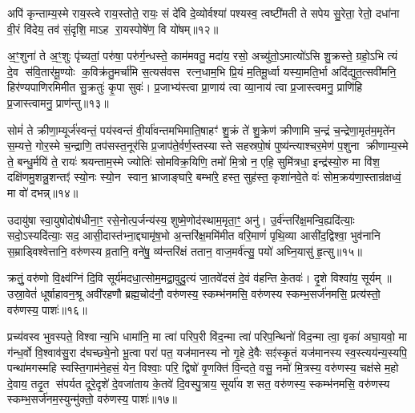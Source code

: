 अपि॑ कृन्ताम्य॒स्मे राय॒स्त्वे राय॒स्तोते॒ रायः॒ सं दे॑वि दे॒व्योर्वश्या॑ पश्यस्व॒ त्वष्टी॑मती ते सपेय सु॒रेता॒ रेतो॒ दधा॑ना वी॒रं वि॑देय॒ तव॑ सं॒दृशि॒ माऽह रा॒यस्पोषे॑ण॒ वि यो॑षम्॥१२॥

{\anuvakamend[{अ॒स्य॒ ग्री॒वा एका॒न्नत्रि॒ꣳ॒शच्च॑॥५॥}]}

अ॒ꣳ॒शुना॑ ते अ॒ꣳ॒शुः पृ॑च्यतां॒ परु॑षा॒ परु॑र्ग॒न्धस्ते॒ काम॑मवतु॒ मदा॑य॒ रसो॒ अच्यु॑तो॒ऽमात्यो॑ऽसि शु॒क्रस्ते॒ ग्रहो॒ऽभि त्यं दे॒व स॑वि॒तार॑मू॒ण्योः क॒विक्र॑तु॒मर्चा॑मि स॒त्यस॑वस रत्न॒धाम॒भि प्रि॒यं म॒तिमू॒र्ध्वा यस्या॒मति॒र्भा अदि॑द्युत॒त्सवी॑मनि॒ हिर॑ण्यपाणिरमिमीत सु॒क्रतुः॑ कृ॒पा सुवः॑। प्र॒जाभ्य॑स्त्वा प्रा॒णाय॑ त्वा व्या॒नाय॑ त्वा प्र॒जास्त्वमनु॒ प्राणि॑हि प्र॒जास्त्वामनु॒ प्राण॑न्तु॥१३॥

{\anuvakamend[{अनु॑ स॒प्त च॑॥६॥}]}

सोमं॑ ते क्रीणा॒म्यूर्ज॑स्वन्तं॒ पय॑स्वन्तं वी॒र्या॑वन्तमभिमाति॒षाहꣳ॑ शु॒क्रं ते॑ शु॒क्रेण॑ क्रीणामि च॒न्द्रं च॒न्द्रेणा॒मृत॑म॒मृते॑न स॒म्यत्ते॒ गोर॒स्मे च॒न्द्राणि॒ तप॑सस्त॒नूर॑सि प्र॒जाप॑ते॒र्वर्ण॒स्तस्यास्ते सहस्रपो॒षं पुष्य॑न्त्याश्चर॒मेण॑ प॒शुना क्रीणाम्य॒स्मे ते॒ बन्धु॒र्मयि॑ ते॒ रायः॑ श्रयन्ताम॒स्मे ज्योतिः॑ सोमविक्र॒यिणि॒ तमो॑ मि॒त्रो न॒ एहि॒ सुमि॑त्रधा॒ इन्द्र॑स्यो॒रु मा वि॑श॒ दक्षि॑णमु॒शन्नु॒शन्तꣵ॑ स्यो॒नः स्यो॒न स्वान॒ भ्राजाङ्घा॑रे॒ बम्भा॑रे॒ हस्त॒ सुह॑स्त॒ कृशा॑नवे॒ते वः॑ सोम॒क्रय॑णा॒स्तान्र॑क्षध्वं॒ मा वो॑ दभन्न्॥१४॥

{\anuvakamend[{ऊ॒रुं द्वाविꣳ॑शतिश्व॥७॥}]}

उदायु॑षा स्वा॒युषोदोष॑धीना॒ꣳ॒ रसे॒नोत्प॒र्जन्य॑स्य॒ शुष्मे॒णोद॑स्थाम॒मृता॒ꣳ॒ अनु॑। उ॒र्व॑न्तरि॑क्ष॒मन्वि॒ह्यदि॑त्याः॒ सदो॒ऽस्यदि॑त्याः॒ सद॒ आसी॒दास्त॑भ्ना॒द्द्यामृ॑ष॒भो अ॒न्तरि॑क्ष॒ममि॑मीत वरि॒माणं॑ पृथि॒व्या आसी॑द॒द्विश्वा॒ भुव॑नानि स॒म्राड्विश्वेत्तानि॒ वरु॑णस्य व्र॒तानि॒ वने॑षु॒ व्य॑न्तरि॑क्षं ततान॒ वाज॒मर्व॑त्सु॒ पयो॑ अघ्नि॒यासु॑ हृ॒त्सु॥१५॥

क्रतुं॒ वरु॑णो वि॒क्ष्व॑ग्निं दि॒वि सूर्य॑मदधा॒त्सोम॒मद्रा॒वुदु॒त्यं जा॒तवे॑दसं दे॒वं व॑हन्ति के॒तवः॑। दृ॒शे विश्वा॑य॒ सूर्यम्॥ उस्रा॒वेतं॑ धूर्\mbox{}षाहावन॒श्रू अवी॑रहणौ ब्रह्म॒चोद॑नौ॒ वरु॑णस्य॒ स्कम्भ॑नमसि॒ वरु॑णस्य स्कम्भ॒सर्ज॑नमसि॒ प्रत्य॑स्तो॒ वरु॑णस्य॒ पाशः॑॥१६॥

{\anuvakamend[{हृ॒त्सु पञ्च॑त्रिशच्च॥८॥}]}

प्रच्य॑वस्व भुवस्पते॒ विश्वान्य॒भि धामा॑नि॒ मा त्वा॑ परिप॒री वि॑द॒न्मा त्वा॑ परिप॒न्थिनो॑ विद॒न्मा त्वा॒ वृका॑ अघा॒यवो॒ मा ग॑न्ध॒र्वो वि॒श्वाव॑सु॒रा द॑घच्छ्ये॒नो भू॒त्वा परा॑ पत॒ यज॑मानस्य नो गृ॒हे दे॒वैः सꣵ॑स्कृ॒तं यज॑मानस्य स्व॒स्त्यय॑न्य॒स्यपि॒ पन्था॑मगस्महि स्वस्ति॒गाम॑ने॒हसं॒ येन॒ विश्वाः॒ परि॒ द्विषो॑ वृ॒णक्ति॑ वि॒न्दते॒ वसु॒ नमो॑ मि॒त्रस्य॒ वरु॑णस्य॒ चक्ष॑से म॒हो दे॒वाय॒ तदृ॒त स॑पर्यत दूरे॒दृशे॑ दे॒वजा॑ताय के॒तवे॑ दि॒वस्पु॒त्राय॒ सूर्या॑य शसत॒ वरु॑णस्य॒ स्कम्भ॑नमसि॒ वरु॑णस्य स्कम्भ॒सर्ज॑नम॒स्युन्मु॑क्तो॒ वरु॑णस्य॒ पाशः॑॥१७॥

